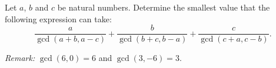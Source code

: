 Let $a$, $b$ and $c$ be natural numbers.
Determine the smallest value that the following expression can take:
\[
    \frac{a}{\gcd(a+b,a-c)}+\frac{b}{\gcd(b+c,b-a)}+\frac{c}{\gcd(c+a,c-b)}.
\]

\emph{Remark:} $\gcd(6,0)=6$ and $\gcd(3,-6)=3$.
